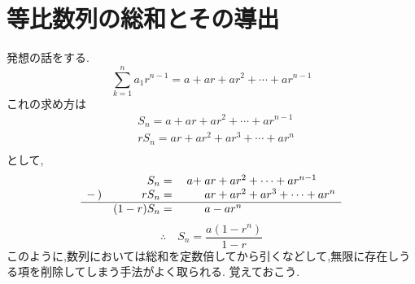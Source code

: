 
\section{等比数列の総和とその導出}
  発想の話をする.
  \[
    \sum_{k=1}^{n} a_1r^{n-1}=a+ar+ar^2+\cdots+ar^{n-1}
  \]
  これの求め方は
  \begin{align*}
    &S_{n}=a+ar+ar^2+\cdots+ar^{n-1} \tag*{\(\cdots\) (1)}\\
    &rS_n=ar+ar^2+ar^3+\cdots+ar^{n} \tag*{\(\cdots\) (2)}\\
  \end{align*}
  として,
  \[
  \begin{array}{rrrl}
      &S_{n}={}&a+&\hspace{-0.75em}ar+ar^2+\cdots+ar^{n-1}\\
    -\,) & rS_n={}&{}&\hspace{-0.75em}ar+ar^2+ar^3+\cdots+ar^{n}\\ \hline
      & (1-r)S_n={}&{}&\hspace{-0.75em}a-ar^n
  \end{array}
  \]
  \[
    \therefore \quad S_n=\frac{a(1-r^n)}{1-r}
  \]
  このように,数列においては総和を定数倍してから引くなどして,無限に存在しうる項を削除してしまう手法がよく取られる.
  覚えておこう.


